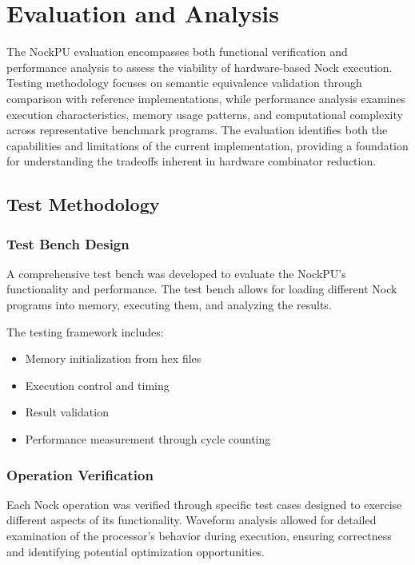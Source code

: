 \documentclass[twoside]{article}
\begin{document}
\section{Evaluation and Analysis}

The NockPU evaluation encompasses both functional verification and performance analysis to assess the viability of hardware-based Nock execution. Testing methodology focuses on semantic equivalence validation through comparison with reference implementations, while performance analysis examines execution characteristics, memory usage patterns, and computational complexity across representative benchmark programs. The evaluation identifies both the capabilities and limitations of the current implementation, providing a foundation for understanding the tradeoffs inherent in hardware combinator reduction.

\subsection{Test Methodology}

\subsubsection{Test Bench Design}

A comprehensive test bench was developed to evaluate the NockPU's functionality and performance. The test bench allows for loading different Nock programs into memory, executing them, and analyzing the results.

The testing framework includes:
\begin{itemize}
  \item Memory initialization from hex files
  \item Execution control and timing
  \item Result validation
  \item Performance measurement through cycle counting
\end{itemize}

\subsubsection{Operation Verification}

Each Nock operation was verified through specific test cases designed to exercise different aspects of its functionality. Waveform analysis allowed for detailed examination of the processor's behavior during execution, ensuring correctness and identifying potential optimization opportunities.
\end{document}
